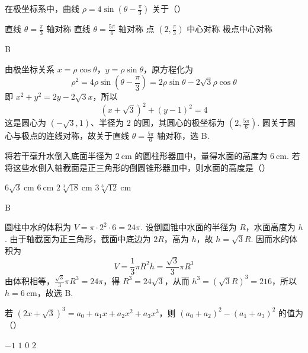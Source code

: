 \begin{problem}
在极坐标系中，曲线 \(\rho=4\sin\left(\theta-\frac{\pi}{3}\right)\) 关于（\quad）

\choices
    {直线 \(\theta=\frac{\pi}{3}\) 轴对称}
    {直线 \(\theta=\frac{5\pi}{6}\) 轴对称}
    {点 \(\left(2,\frac{\pi}{3}\right)\) 中心对称}
    {极点中心对称}
\end{problem}

\begin{answer}
B
\end{answer}

\begin{solution}
由极坐标关系 \(x=\rho\cos\theta\)，\(y=\rho\sin\theta\)，原方程化为
\[
\rho^2=4\rho\sin\left(\theta-\frac{\pi}{3}\right)=2\rho\sin\theta-2\sqrt3\rho\cos\theta
\]
即
\(x^2+y^2=2y-2\sqrt3x\)，所以
\[
(x+\sqrt3)^2+(y-1)^2=4
\]
这是圆心为 \((-\sqrt3,1)\)、半径为 \(2\) 的圆，其圆心的极坐标为 \(\left(2,\frac{5\pi}{6}\right)\). 圆关于圆心与极点的连线对称，故关于直线 \(\theta=\frac{5\pi}{6}\) 轴对称，选 B.
\end{solution}

\begin{problem}
将若干毫升水倒入底面半径为 \(2\mathrm{~cm}\) 的圆柱形器皿中，量得水面的高度为 \(6\mathrm{~cm}\). 若将这些水倒入轴截面是正三角形的倒圆锥形器皿中，则水面的高度是（\quad）

\choices
    {\(6\sqrt{3}\mathrm{~cm}\)}
    {\(6\mathrm{~cm}\)}
    {\(2\sqrt[3]{18}\mathrm{~cm}\)}
    {\(3\sqrt[3]{12}\mathrm{~cm}\)}
\end{problem}

\begin{answer}
B
\end{answer}

\begin{solution}
圆柱中水的体积为
\(V=\pi\cdot 2^2\cdot 6=24\pi\). 设倒圆锥中水面的半径为 \(R\)，水面高度为 \(h\). 由于轴截面为正三角形，截面中底边为 \(2R\)，高为 \(h\)，故
\(h=\sqrt3R\). 因而水的体积为
\[
V=\frac13\pi R^2h=\frac{\sqrt3}{3}\pi R^3
\]
由体积相等，\(\frac{\sqrt3}{3}\pi R^3=24\pi\)，得 \(R^3=24\sqrt3\)，从而
\(h^3=(\sqrt3R)^3=216\)，所以 \(h=6\mathrm{~cm}\)，故选 B.
\end{solution}

\begin{problem}
若 \(\left(2x+\sqrt3\right)^3=a_0+a_1x+a_2x^2+a_3x^3\)，则 \((a_0+a_2)^2-(a_1+a_3)^2\) 的值为（\quad）

\choices
    {\(-1\)}
    {\(1\)}
    {\(0\)}
    {\(2\)}
\end{problem}

